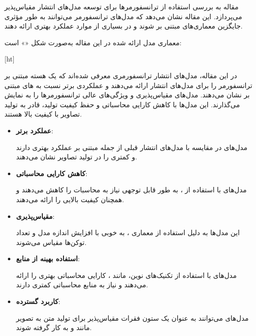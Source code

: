 مقاله  به بررسی استفاده از ترانسفورمرها برای توسعه مدل‌های انتشار مقیاس‌پذیر می‌پردازد. این مقاله نشان می‌دهد که مدل‌های ترانسفورمر می‌توانند به طور مؤثری جایگزین معماری‌های مبتنی بر  شوند و در بسیاری از موارد عملکرد بهتری ارائه دهند.

معماری مدل ارائه شده در این مقاله به‌صورت شکل «» است:

[ht]


در این مقاله، مدل‌های انتشار ترانسفورمری معرفی شده‌اند که یک هسته مبتنی بر ترانسفورمر را برای مدل‌های انتشار ارائه می‌دهند و عملکردی برتر نسبت به  های مبتنی بر  نشان می‌دهند. مدل‌های  مقیاس‌پذیری و ویژگی‌های عالی ترانسفورمرها را به نمایش می‌گذارند. این مدل‌ها با کاهش کارایی محاسباتی و حفظ کیفیت تولید، قادر به تولید تصاویر با کیفیت بالا هستند.

\begin{itemize}
	\item \textbf{عملکرد برتر}:
	
	مدل‌های  در مقایسه با مدل‌های انتشار قبلی از جمله  مبتنی بر  عملکرد بهتری دارند و  کمتری را در تولید تصاویر نشان می‌دهند.
	
	\item \textbf{کاهش کارایی محاسباتی}:
	
	مدل‌های  با استفاده از ، به طور قابل توجهی نیاز به محاسبات را کاهش می‌دهند و همچنان کیفیت بالایی را ارائه می‌دهند.
	
	\item \textbf{مقیاس‌پذیری}:
	
	این مدل‌ها به دلیل استفاده از معماری ، به خوبی با افزایش اندازه مدل و تعداد توکن‌ها مقیاس می‌شوند.
	
	\item \textbf{استفاده بهینه از منابع}:
	
	مدل‌های  با استفاده از تکنیک‌های نوین، مانند ، کارایی محاسباتی بهتری را ارائه می‌دهند و نیاز به منابع محاسباتی کمتری دارند.
	
	\item \textbf{کاربرد گسترده}:
	
	مدل‌های  می‌توانند به عنوان یک ستون فقرات مقیاس‌پذیر برای تولید متن به تصویر مانند  و  به کار گرفته شوند.
\end{itemize}







